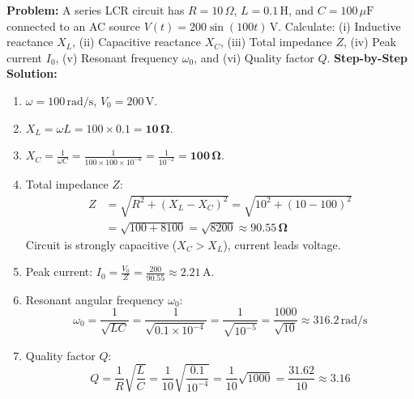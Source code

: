\documentclass[10pt,twoside,openright]{book}
\begin{document}
\begin{usecasebox}
\textbf{Problem:} A series LCR circuit has $R = 10\,\Omega$, $L = 0.1\,\mathrm{H}$, and $C = 100\,\mu\mathrm{F}$ connected to an AC source $V(t) = 200 \sin(100 t)\,\mathrm{V}$. Calculate: (i) Inductive reactance $X_L$, (ii) Capacitive reactance $X_C$, (iii) Total impedance $Z$, (iv) Peak current $I_0$, (v) Resonant frequency $\omega_0$, and (vi) Quality factor $Q$.
\textbf{Step-by-Step Solution:}
\begin{enumerate}
  \item $\omega = 100\,\mathrm{rad/s}$, $V_0 = 200\,\mathrm{V}$.
  \item $X_L = \omega L = 100 \times 0.1 = \mathbf{10\,\Omega}$.
  \item $X_C = \frac{1}{\omega C} = \frac{1}{100 \times 100 \times 10^{-6}} = \frac{1}{10^{-2}} = \mathbf{100\,\Omega}$.
  \item Total impedance $Z$:
  \begin{equation}
  \begin{aligned}
    Z &= \sqrt{R^2 + (X_L - X_C)^2} = \sqrt{10^2 + (10 - 100)^2} \\
      &= \sqrt{100 + 8100} = \sqrt{8200} \approx \mathbf{90.55\,\Omega}
  \end{aligned}
  \end{equation}
  Circuit is strongly capacitive ($X_C > X_L$), current leads voltage.
  \item Peak current: $I_0 = \frac{V_0}{Z} = \frac{200}{90.55} \approx \mathbf{2.21\,\mathrm{A}}$.
  \item Resonant angular frequency $\omega_0$:
  \begin{equation}
    \omega_0 = \frac{1}{\sqrt{LC}} = \frac{1}{\sqrt{0.1 \times 10^{-4}}} = \frac{1}{\sqrt{10^{-5}}} = \frac{1000}{\sqrt{10}} \approx \mathbf{316.2\,\mathrm{rad/s}}
  \end{equation}
  \item Quality factor $Q$:
  \begin{equation}
    Q = \frac{1}{R}\sqrt{\frac{L}{C}} = \frac{1}{10}\sqrt{\frac{0.1}{10^{-4}}} = \frac{1}{10}\sqrt{1000} = \frac{31.62}{10} \approx \mathbf{3.16}
  \end{equation}
\end{enumerate}
\end{usecasebox}

\end{document}
